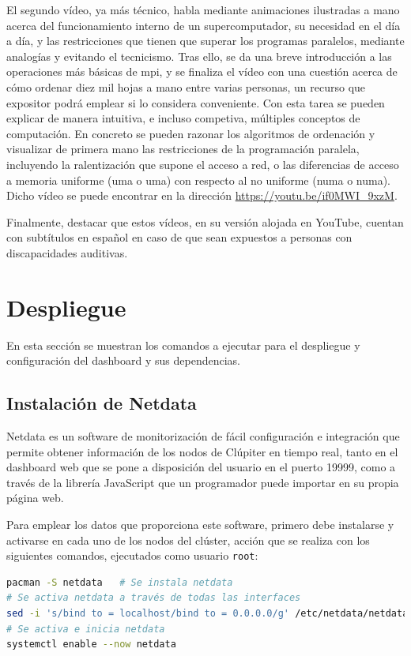 El segundo vídeo, ya más técnico, habla mediante animaciones ilustradas a mano acerca del funcionamiento interno de un supercomputador, su necesidad en el día a día, y las restricciones que tienen que superar los programas paralelos, mediante analogías y evitando el tecnicismo. Tras ello, se da una breve introducción a las operaciones más básicas de \acrshort{mpi}, y se finaliza el vídeo con una cuestión acerca de cómo ordenar diez mil hojas a mano entre varias personas, un recurso que expositor podrá emplear si lo considera conveniente. Con esta tarea se pueden explicar de manera intuitiva, e incluso competiva, múltiples conceptos de computación. En concreto se pueden razonar los algoritmos de ordenación y visualizar de primera mano las restricciones de la programación paralela, incluyendo la ralentización que supone el acceso a red, o las diferencias de acceso a memoria uniforme (\acrshort{uma} o \acrlong{uma}) con respecto al no uniforme (\acrshort{numa} o \acrlong{numa}). Dicho vídeo se puede encontrar en la dirección \url{https://youtu.be/if0MWI_9xzM}.

Finalmente, destacar que estos vídeos, en su versión alojada en YouTube, cuentan con subtítulos en español en caso de que sean expuestos a personas con discapacidades auditivas.

\section{Despliegue}
En esta sección se muestran los comandos a ejecutar para el despliegue y configuración del dashboard y sus dependencias.

\subsection{Instalación de Netdata}
Netdata es un software de monitorización de fácil configuración e integración que permite obtener información de los nodos de Clúpiter en tiempo real, tanto en el dashboard web que se pone a disposición del usuario en el puerto 19999, como a través de la librería JavaScript que un programador puede importar en su propia página web.

Para emplear los datos que proporciona este software, primero debe instalarse y activarse en cada uno de los nodos del clúster, acción que se realiza con los siguientes comandos, ejecutados como usuario \texttt{root}:

\begin{lstlisting}[language=bash]
pacman -S netdata   # Se instala netdata
# Se activa netdata a través de todas las interfaces
sed -i 's/bind to = localhost/bind to = 0.0.0.0/g' /etc/netdata/netdata.conf
# Se activa e inicia netdata
systemctl enable --now netdata
\end{lstlisting}


